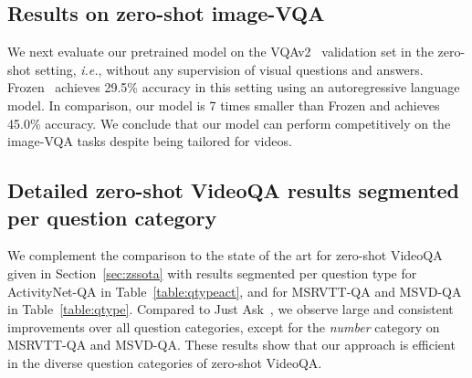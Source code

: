 \subsection{Results on zero-shot image-VQA}\label{sec:imagevqa}
We next evaluate our pretrained model on the VQAv2~\cite{antol2015vqa} validation set in the zero-shot setting, \textit{i.e.}, without any supervision of visual questions and answers. Frozen~\cite{tsimpoukelli2021multimodal} achieves 29.5\% accuracy in this setting using an autoregressive language model. In comparison, our \model{} model is 7 times smaller than Frozen and achieves 45.0\% accuracy. We conclude that our model can perform competitively on the image-VQA tasks despite being tailored for videos.

\subsection{Detailed zero-shot VideoQA results segmented per question category}\label{sec:qtype}
We complement the comparison to the state of the art for zero-shot VideoQA given in Section~\ref{sec:zssota} with results segmented per question type for ActivityNet-QA in Table~\ref{table:qtypeact}, and for MSRVTT-QA and MSVD-QA in Table~\ref{table:qtype}.
Compared to Just Ask~\cite{yang2021just}, we observe large and consistent improvements over all question categories, except for the \textit{number} category on MSRVTT-QA and MSVD-QA.
These results show that our approach is efficient in the diverse question categories of zero-shot VideoQA.

